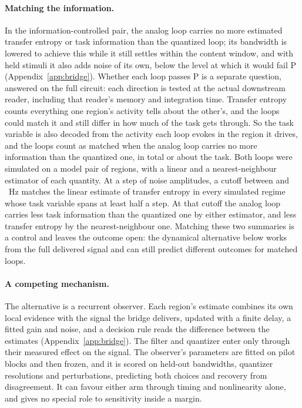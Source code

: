\documentclass[12pt]{article}
\begin{document}
\paragraph{Matching the information.} In the information-controlled pair, the
analog loop carries no more estimated transfer entropy or task information than
the quantized loop; its bandwidth is lowered to achieve this while it still
settles within the content window, and with held stimuli it also adds noise of
its own, below the level at which it would fail P (Appendix~\ref{app:bridge}). Whether each
loop passes P is a separate question, answered on the full circuit: each
direction is tested at the actual downstream reader, including that reader's
memory and integration time. Transfer entropy counts everything one region's
activity tells about the other's, and the loops could match it and still differ
in how much of the task gets through. So the task variable is also decoded from
the activity each loop evokes in the region it drives, and the loops count as
matched when the analog loop carries no more information than the quantized
one, in total or about the task. Both loops were simulated on a model pair of
regions, with a linear and a nearest-neighbour estimator of each quantity. At a step of
\ueBridgeStepToNoise{} noise amplitudes, a cutoff between \uBrCutoffMin{} and
\uBrCutoffMax{}~Hz matches the linear estimate of transfer entropy in every
simulated regime whose task variable spans at least half a step. At that cutoff
the analog loop carries less task information than the quantized one by either
estimator, and less transfer entropy by the nearest-neighbour one. Matching
these two summaries is a control and leaves the outcome open: the dynamical
alternative below works from the full delivered signal and can still predict
different outcomes for matched loops.

\paragraph{A competing mechanism.} The alternative is a recurrent observer. Each
region's estimate combines its own local evidence with the signal the bridge
delivers, updated with a finite delay, a fitted gain and noise, and a decision
rule reads the difference between the estimates (Appendix~\ref{app:bridge}).
The filter and quantizer enter only through their measured effect on the
signal. The observer's parameters are fitted on pilot blocks and then frozen,
and it is scored on held-out bandwidths, quantizer resolutions and
perturbations, predicting both choices and recovery from disagreement. It can
favour either arm through timing and nonlinearity alone, and gives no special
role to sensitivity inside a margin.
\end{document}
